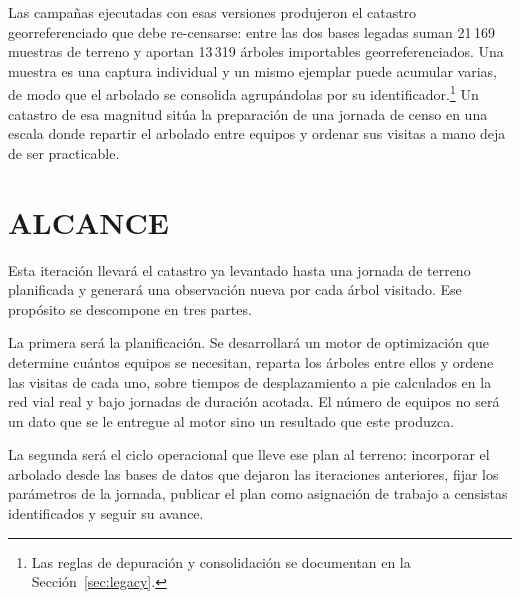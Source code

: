 
Las campañas ejecutadas con esas versiones produjeron el catastro georreferenciado que debe
re-censarse: entre las dos bases legadas suman 21\,169
muestras de terreno y aportan 13\,319 árboles importables georreferenciados. Una muestra
es una captura individual y un mismo ejemplar puede acumular varias, de modo que el arbolado se
consolida agrupándolas por su identificador.\footnote{Las reglas de depuración y consolidación se
documentan en la Sección~\ref{sec:legacy}.} Un catastro de esa magnitud sitúa la preparación de una
jornada de censo en una escala donde repartir el arbolado entre equipos y ordenar sus visitas a
mano deja de ser practicable.

\section{ALCANCE}
\label{sec:alcance-desarrollo}

Esta iteración llevará el catastro ya levantado hasta una jornada de terreno planificada y generará
una observación nueva por cada árbol visitado. Ese propósito se descompone en tres partes.

La primera será la planificación. Se desarrollará un motor de optimización que determine cuántos
equipos se necesitan, reparta los árboles entre ellos y ordene las visitas de cada uno, sobre
tiempos de desplazamiento a pie calculados en la red vial real y bajo jornadas de duración acotada.
El número de equipos no será un dato que se le entregue al motor sino un resultado que este produzca.

La segunda será el ciclo operacional que lleve ese plan al terreno: incorporar el arbolado desde las
bases de datos que dejaron las iteraciones anteriores, fijar los parámetros de la jornada, publicar
el plan como asignación de trabajo a censistas identificados y seguir su avance.

